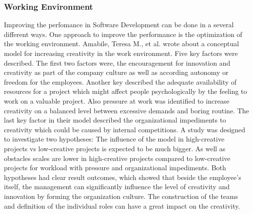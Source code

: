 \subsubsection{Working Environment}
Improving the perfomance in Software Development can be done in a several different ways. One approach to improve the performance is the optimization of the working environment. Amabile, Teresa M., et al. \cite{amabile1996assessing} wrote about a conceptual model for increasing creativity in the work environment. Five key factors were described. The first two factors were, the encouragement for innovation and creativity as part of the company culture as well as according autonomy or freedom for the employees. Another key described the adequate availability of resources for a project which might affect people psychologically by the feeling to work on a valuable project. Also pressure at work was identified to increase creativity on a balanced level between excessive demands and boring routine. The last key factor in their model described the organizational impediments to creativity which could be caused by internal competitions.
A study was designed to investigate two hypotheses: The influence of the model in high-creative projects vs low-creative projects is expected to be much bigger. As well as obstacles scales are lower in high-creative projects compared to low-creative projects for workload with pressure and organizational impediments.
Both hypotheses had clear result outcomes, which showed that beside the employee's itself, the management can significantly influence the level of creativity and innovation by forming the organization culture. The construction of the teams and definition of the individual roles can have a great impact on the creativity. 

